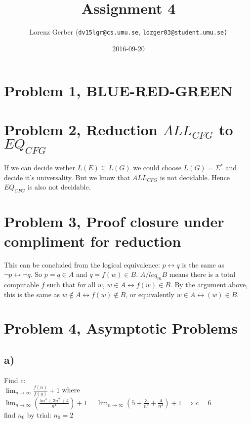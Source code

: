 \documentclass[a4paper,11pt,twoside]{article}
\title{Assignment 4}
\author{Lorenz Gerber ({\tt{dv15lgr@cs.umu.se}}, {\tt{lozger03@student.umu.se})}}
\date{2016-09-20}
\begin{document}
\lstset{language=C}
\maketitle
\thispagestyle{empty}
\newpage

\clearpage
{}

\section*{Problem 1, BLUE-RED-GREEN}

\section*{Problem 2, Reduction $ALL_{CFG}$ to $EQ_{CFG}$}
If we can decide wether $L(E) \subseteq L(G)$ we could choose $L(G) =
\Sigma^{*}$ and decide it's universality. But we know that $ALL_{CFG}$ is
not decidable. Hence $EQ_{CFG}$ is also not decidable. 

\section*{Problem 3, Proof closure under compliment for reduction}
This can be concluded from the logical equivalence: $p \leftrightarrow q$ is the same as $\neg p \leftrightarrow \neg q$. So $p = q \in A$ and $q = f(w) \in B$. $A /leq_{m} B$ means there is a total computable $f$ such that for all $w$, $w \in A \leftrightarrow f(w) \in B$. By the argument above, this is the same as $w \notin A \leftrightarrow f(w) \notin B$, or equivalently $w \in \bar{A} \leftrightarrow(w) \in \bar{B}$.

\section*{Problem 4, Asymptotic Problems}
\subsection*{a)}
Find $c$:\\
$\lim_{n \to \infty} \frac{f(n)}{f(g)}+1$ where \\
$\lim_{n \to \infty}(\frac{5n^{4}+3n^{2}+4}{n^{4}})+1 = \lim_{n \to \infty}(5+ \frac{3}{n^{2}}+\frac{4}{n^{4}})+1 \implies c = 6$\\
find $n_{0}$ by trial: $n_{0} = 2$ \\
\end{document}
